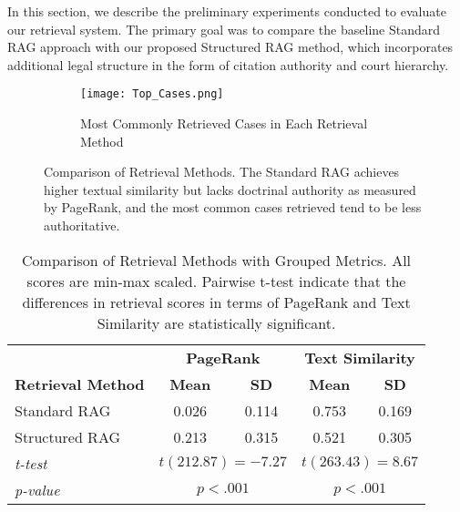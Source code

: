 

In this section, we describe the preliminary experiments conducted to evaluate our retrieval system. The primary goal was to compare the baseline Standard RAG approach with our proposed Structured RAG method, which incorporates additional legal structure in the form of citation authority and court hierarchy.

\begin{figure*}[htbp]
  \centering
  \begin{subfigure}[b]{0.52\textwidth}
    \centering
    \texttt{[image: Top\_Cases.png]}
    \caption{Most Commonly Retrieved Cases in Each Retrieval Method}
    \label{fig:topcases}
  \end{subfigure}
  \hfill %
  \caption{Comparison of Retrieval Methods. The Standard RAG achieves higher textual similarity but lacks doctrinal authority as measured by PageRank, and the most common cases retrieved tend to be less authoritative.}
  \label{fig:combined}
\end{figure*}



\begin{table}[ht]
  \centering
	\caption{Comparison of Retrieval Methods with Grouped Metrics. All scores are min-max scaled. Pairwise t-test indicate that the differences in retrieval scores in terms of PageRank and Text Similarity are statistically significant.}
  \label{tab:grouped_retrieval_comparison}
  \begin{tabular}{l cc | cc}
  \toprule
	  & \multicolumn{2}{c}{\textbf{PageRank}} & \multicolumn{2}{c}{\textbf{Text Similarity}} \\
  \cmidrule(r){2-3} \cmidrule(l){4-5}
	  \textbf{Retrieval Method} & \textbf{Mean}    & \textbf{SD}    & \textbf{Mean}      & \textbf{SD}      \\
  \midrule
  Standard RAG    & 0.026 & 0.114 & 0.753 & 0.169 \\
  Structured RAG  & 0.213 & 0.315 & 0.521 & 0.305 \\
  \midrule
	  \textit{t-test} & \multicolumn{2}{c}{$t(212.87)=-7.27$} & \multicolumn{2}{c}{$t(263.43)=8.67$} \\
	  \textit{p-value}& \multicolumn{2}{c}{$p < .001$} & \multicolumn{2}{c}{$p < .001$} \\
  \bottomrule
  \end{tabular}
  \end{table}
  

